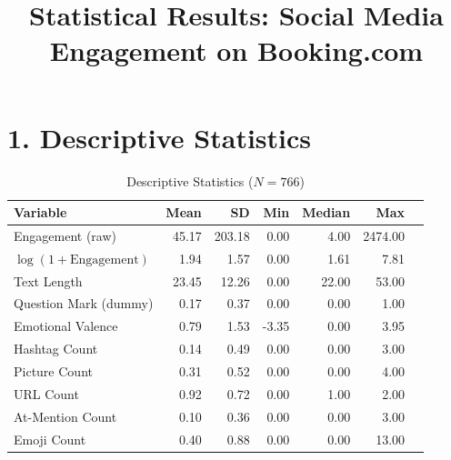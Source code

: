 \documentclass[12pt,a4paper]{article}
\title{Statistical Results: Social Media Engagement on Booking.com}
\author{}
\date{}
\begin{document}
\maketitle

\section*{1. Descriptive Statistics}
\begin{table}[h]
\centering
\caption{Descriptive Statistics ($N=766$)}
\begin{threeparttable}
\begin{tabular}{lrrrrrr}
\toprule
Variable & Mean & SD & Min & Median & Max \\
\midrule
Engagement (raw)          & 45.17  & 203.18 & 0.00 & 4.00 & 2474.00 \\
$\log(1+\text{Engagement})$ & 1.94   & 1.57   & 0.00 & 1.61 & 7.81 \\
Text Length               & 23.45  & 12.26  & 0.00 & 22.00& 53.00 \\
Question Mark (dummy)     & 0.17   & 0.37   & 0.00 & 0.00 & 1.00 \\
Emotional Valence         & 0.79   & 1.53   & -3.35& 0.00 & 3.95 \\
Hashtag Count             & 0.14   & 0.49   & 0.00 & 0.00 & 3.00 \\
Picture Count             & 0.31   & 0.52   & 0.00 & 0.00 & 4.00 \\
URL Count                 & 0.92   & 0.72   & 0.00 & 1.00 & 2.00 \\
At-Mention Count          & 0.10   & 0.36   & 0.00 & 0.00 & 3.00 \\
Emoji Count               & 0.40   & 0.88   & 0.00 & 0.00 & 13.00 \\
\bottomrule
\end{tabular}
\end{threeparttable}
\end{table}
\end{document}
